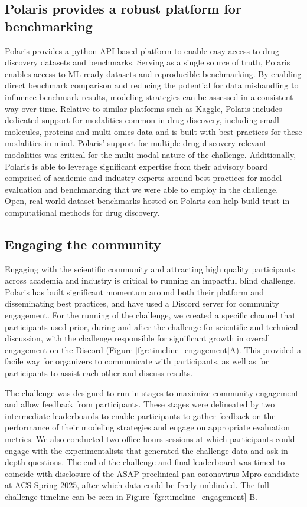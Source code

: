 \documentclass[journal=jcim,manuscript=article]{achemso}
\begin{document}
\subsection{Polaris provides a robust platform for benchmarking}

 Polaris provides a python API based platform to enable easy access to drug discovery datasets and benchmarks. Serving as a single source of truth, Polaris enables access to ML-ready datasets and reproducible benchmarking. By enabling direct benchmark comparison and reducing the potential for data mishandling to influence benchmark results, modeling strategies can be assessed in a consistent way over time. Relative to similar platforms such as Kaggle, Polaris includes dedicated support for modalities common in drug discovery, including small molecules, proteins and multi-omics data and is built with best practices for these modalities in mind. Polaris' support for multiple drug discovery relevant modalities was critical for the multi-modal nature of the challenge.  Additionally, Polaris is able to leverage significant expertise from their advisory board comprised of academic and industry experts around best practices for model evaluation and benchmarking that we were able to employ in the challenge. Open, real world dataset benchmarks hosted on Polaris can help build trust in computational methods for drug discovery.

\subsection{Engaging the community}

Engaging with the scientific community and attracting high quality participants across academia and industry is critical to running an impactful blind challenge. Polaris has built significant momentum around both their platform and disseminating best practices, and have used a Discord server for community engagement. For the running of the challenge, we created a specific channel  that participants used prior, during and after the challenge for scientific and technical discussion, with the challenge responsible for significant growth in overall engagement on the Discord (Figure \ref{fgr:timeline_engagement}A). This provided a facile way for organizers to communicate with participants, as well as for participants to assist each other and discuss results. 


The challenge was designed to run in stages to maximize community engagement and allow feedback from participants. These stages were delineated by two intermediate leaderboards to enable participants to gather feedback on the performance of their modeling strategies and engage on appropriate evaluation metrics. We also conducted two office hours sessions at which participants could engage with the experimentalists that generated the challenge data and ask in-depth questions. The end of the challenge and final leaderboard was timed to coincide with disclosure of the ASAP preclinical pan-coronavirus Mpro candidate at ACS Spring 2025\cite{griffen_2025_acs}, after which data could be freely unblinded.  The full challenge timeline can be seen in Figure \ref{fgr:timeline_engagement} B.
\end{document}
